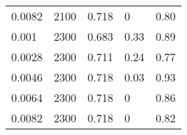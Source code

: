 \begin{table}[tbp]
\begin{center}
\begin{tabular}{lllll}
\num{0,0082} & \num{2100} & \num{0,718} & \num{0}    & \num{0,80}\\
\num{0,001}  & \num{2300} & \num{0,683} & \num{0,33} & \num{0,89}\\
\num{0,0028} & \num{2300} & \num{0,711} & \num{0,24} & \num{0,77}\\
\num{0,0046} & \num{2300} & \num{0,718} & \num{0,03} & \num{0,93}\\
\num{0,0064} & \num{2300} & \num{0,718} & \num{0}    & \num{0,86}\\
\num{0,0082} & \num{2300} & \num{0,718} & \num{0}    & \num{0,82}\\
  \hline
  \end{tabular}
  \end{center}
\end{table}


